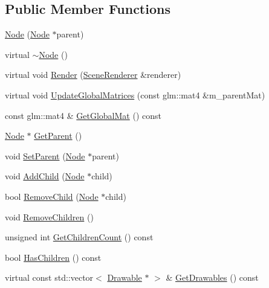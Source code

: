 \subsection*{Public Member Functions}
\begin{DoxyCompactItemize}
\item 
\mbox{\hyperlink{classec_1_1_node_a99fb4715fbc3f193ad5ed88dff15cd0e}{Node}} (\mbox{\hyperlink{classec_1_1_node}{Node}} $\ast$parent)
\item 
virtual \mbox{\hyperlink{classec_1_1_node_a6b2dfa6d2490ec46a5d15a326780889b}{$\sim$\+Node}} ()
\item 
virtual void \mbox{\hyperlink{classec_1_1_node_ac606be4f6d5a899a0b9679b6767ff109}{Render}} (\mbox{\hyperlink{classec_1_1_scene_renderer}{Scene\+Renderer}} \&renderer)
\item 
virtual void \mbox{\hyperlink{classec_1_1_node_ac9970ec0ec03e130da59d0d5376a9855}{Update\+Global\+Matrices}} (const glm\+::mat4 \&m\+\_\+parent\+Mat)
\item 
const glm\+::mat4 \& \mbox{\hyperlink{classec_1_1_node_aafbc9c31eb710b1ac22834792e039435}{Get\+Global\+Mat}} () const
\item 
\mbox{\hyperlink{classec_1_1_node}{Node}} $\ast$ \mbox{\hyperlink{classec_1_1_node_a88919835b03a7055f4c1c50c68b83fac}{Get\+Parent}} ()
\item 
void \mbox{\hyperlink{classec_1_1_node_abda1732f28b0f81df2028d889eb73bdf}{Set\+Parent}} (\mbox{\hyperlink{classec_1_1_node}{Node}} $\ast$parent)
\item 
void \mbox{\hyperlink{classec_1_1_node_a769243d9432b14a0c4362c98f4c89a73}{Add\+Child}} (\mbox{\hyperlink{classec_1_1_node}{Node}} $\ast$child)
\item 
bool \mbox{\hyperlink{classec_1_1_node_a65f938c730afc4f5b4fcceb64ac84416}{Remove\+Child}} (\mbox{\hyperlink{classec_1_1_node}{Node}} $\ast$child)
\item 
void \mbox{\hyperlink{classec_1_1_node_ae91a96819729bc06c17870fa8cca2129}{Remove\+Children}} ()
\item 
unsigned int \mbox{\hyperlink{classec_1_1_node_afc08689badadadcbbca919858994d30b}{Get\+Children\+Count}} () const
\item 
bool \mbox{\hyperlink{classec_1_1_node_add6f4b234aebaeb7d1e76d42234b9831}{Has\+Children}} () const
\item 
virtual const std\+::vector$<$ \mbox{\hyperlink{classec_1_1_drawable}{Drawable}} $\ast$ $>$ \& \mbox{\hyperlink{classec_1_1_node_ab1cd50204e1b38c9c1b31e46d13ea915}{Get\+Drawables}} () const

\end{DoxyCompactItemize}

